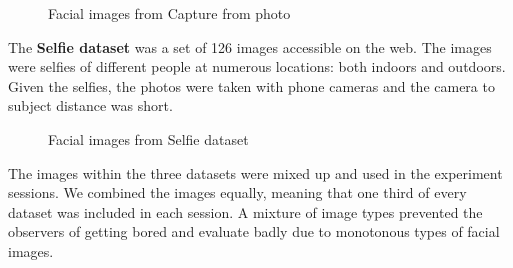 \begin{figure}[h]
    \centering
    \qquad
    \caption{Facial images from Capture from photo}
    \label{fig:capture_from_photo}
\end{figure}
\noindent
The \textbf{Selfie dataset} was a set of 126 images accessible on the web. The images were selfies of different people at numerous locations: both indoors and outdoors. Given the selfies, the photos were taken with phone cameras and the camera to subject distance was short. 
\begin{figure}[h]
    \centering
    \qquad
    \caption{Facial images from Selfie dataset}
    \label{fig:selfie_dataset}
\end{figure}
\noindent
The images within the three datasets were mixed up and used in the experiment sessions. We combined the images equally, meaning that one third of every dataset was included in each session. A mixture of image types prevented the observers of getting bored and evaluate badly due to monotonous types of facial images. 

